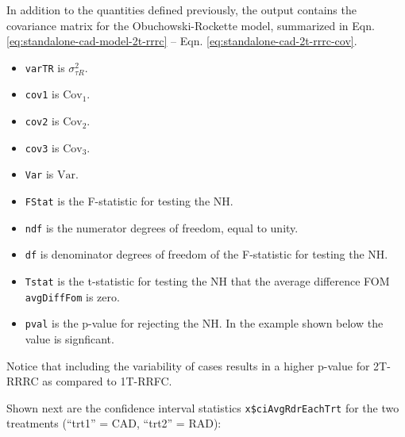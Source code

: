 \documentclass[
]{book}
\newenvironment{Shaded}{\begin{snugshade}}{\end{snugshade}}
\newcommand{\CommentTok}[1]{\textcolor[rgb]{0.56,0.35,0.01}{\textit{#1}}}
\newcommand{\KeywordTok}[1]{\textcolor[rgb]{0.13,0.29,0.53}{\textbf{#1}}}
\newcommand{\NormalTok}[1]{#1}
\newcommand{\OperatorTok}[1]{\textcolor[rgb]{0.81,0.36,0.00}{\textbf{#1}}}
\providecommand{\tightlist}{%
  \setlength{\itemsep}{0pt}\setlength{\parskip}{0pt}}
\begin{document}
In addition to the quantities defined previously, the output contains the covariance matrix for the Obuchowski-Rockette model, summarized in Eqn. \eqref{eq:standalone-cad-model-2t-rrrc} -- Eqn. \eqref{eq:standalone-cad-2t-rrrc-cov}.

\begin{itemize}
\tightlist
\item
  \texttt{varTR} is \(\sigma_{\tau R}^2\).
\item
  \texttt{cov1} is \(\text{Cov}_1\).
\item
  \texttt{cov2} is \(\text{Cov}_2\).
\item
  \texttt{cov3} is \(\text{Cov}_3\).
\item
  \texttt{Var} is \(\text{Var}\).
\item
  \texttt{FStat} is the F-statistic for testing the NH.
\item
  \texttt{ndf} is the numerator degrees of freedom, equal to unity.
\item
  \texttt{df} is denominator degrees of freedom of the F-statistic for testing the NH.
\item
  \texttt{Tstat} is the t-statistic for testing the NH that the average difference FOM \texttt{avgDiffFom} is zero.
\item
  \texttt{pval} is the p-value for rejecting the NH. In the example shown below the value is signficant.
\end{itemize}

Notice that including the variability of cases results in a higher p-value for 2T-RRRC as compared to 1T-RRFC.

Shown next are the confidence interval statistics \texttt{x\$ciAvgRdrEachTrt} for the two treatments (``trt1'' = CAD, ``trt2'' = RAD):

\begin{Shaded}
\end{Shaded}
\end{document}
